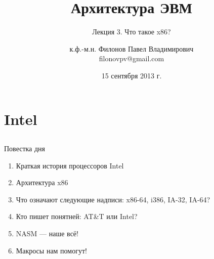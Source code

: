 \documentclass{beamer}
\title{Архитектура ЭВМ}
\subtitle{Лекция 3. Что такое x86?}
\author{к.ф.-м.н. Филонов Павел Владимирович \\ filonovpv@gmail.com}
\date{15 сентября 2013 г.}
\institute[МГТУ ГА] 
{
    Московский Государственный Технический Университет \\
    Гражданской Авиации
}
\begin{document}
    \frame{\titlepage}
    \section{Intel}
    \subsection{}
    \begin{frame}{Повестка дня}
    	\begin{enumerate}
    	\pause
    	\item Краткая история процессоров Intel
    	\pause
    	\item Архитектура x86
    	\pause
    	\item Что означают следующие надписи: x86-64, i386, IA-32, IA-64?
    	\pause
    	\item Кто пишет понятней: AT\&T или Intel?
    	\pause
    	\item NASM --- наше всё!
    	\pause
    	\item Макросы нам помогут!
    	\end{enumerate}
    \end{frame}
\end{document}
